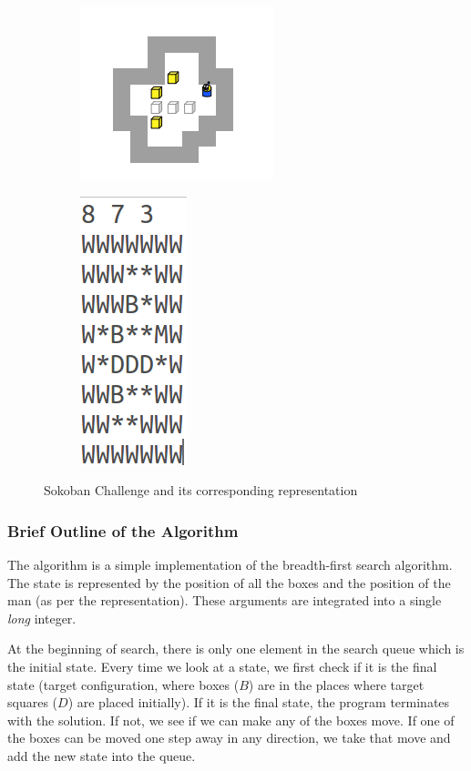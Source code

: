 \documentclass[10pt, letter]{article}
\begin{document}
\begin{figure} [h!]
\centering
\begin{subfigure}{.5\textwidth}
  \centering
  \includegraphics[scale = 0.5]{images/sokobanC}
\end{subfigure}%
\begin{subfigure}{.5\textwidth}
  \centering
  \includegraphics[scale = 0.5]{images/sokobanC-plan}
\end{subfigure}%
\caption{Sokoban Challenge and its corresponding representation}
\label{sokoC}
\end{figure}

\subsubsection*{Brief Outline of the Algorithm}
The algorithm is a simple implementation of the breadth-first search algorithm. The state is represented by the position of all the boxes and the position of the man (as per the representation). These arguments are integrated into a single \textit{long} integer. 

At the beginning of search, there is only one element in the search queue which is the initial state. Every time we look at a state, we first check if it is the final state (target configuration, where boxes ($B$) are in the places where target squares ($D$) are placed initially). If it is the final state, the program terminates with the solution. If not, we see if we can make any of the boxes move. If one of the boxes can be moved one step away in any direction, we take that move and add the new state into the queue. 
\end{document}
